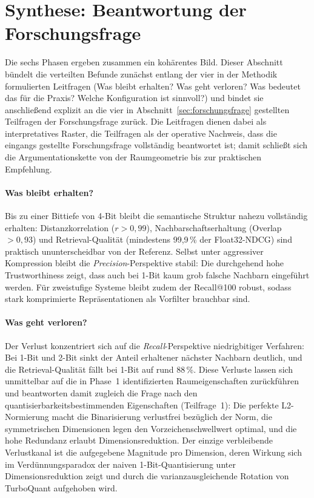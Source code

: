 \section{Synthese: Beantwortung der Forschungsfrage}
\label{sec:ergebnisse_synthese}
%
Die sechs Phasen ergeben zusammen ein kohärentes Bild.
Dieser Abschnitt bündelt die verteilten Befunde zunächst entlang der vier in der Methodik formulierten Leitfragen (Was bleibt erhalten? Was geht verloren? Was bedeutet das für die Praxis? Welche Konfiguration ist sinnvoll?) und bindet sie anschließend explizit an die vier in Abschnitt~\ref{sec:forschungsfrage} gestellten Teilfragen der Forschungsfrage zurück.
Die Leitfragen dienen dabei als interpretatives Raster, die Teilfragen als der operative Nachweis, dass die eingangs gestellte Forschungsfrage vollständig beantwortet ist; damit schließt sich die Argumentationskette von der Raumgeometrie bis zur praktischen Empfehlung.
%
\paragraph{Was bleibt erhalten?}
Bis zu einer Bittiefe von 4-Bit bleibt die semantische Struktur nahezu vollständig erhalten: Distanzkorrelation ($r > 0{,}99$), Nachbarschaftserhaltung (Overlap $> 0{,}93$) und Retrieval-Qualität (mindestens 99{,}9\,\% der Float32-NDCG) sind praktisch ununterscheidbar von der Referenz.
Selbst unter aggressiver Kompression bleibt die \emph{Precision}-Perspektive stabil: Die durchgehend hohe Trustworthiness zeigt, dass auch bei 1-Bit kaum grob falsche Nachbarn eingeführt werden.
Für zweistufige Systeme bleibt zudem der Recall@100 robust, sodass stark komprimierte Repräsentationen als Vorfilter brauchbar sind.
%
\paragraph{Was geht verloren?}
Der Verlust konzentriert sich auf die \emph{Recall}-Perspektive niedrigbitiger Verfahren: Bei 1-Bit und 2-Bit sinkt der Anteil erhaltener nächster Nachbarn deutlich, und die Retrieval-Qualität fällt bei 1-Bit auf rund 88\,\%.
Diese Verluste lassen sich unmittelbar auf die in Phase~1 identifizierten Raumeigenschaften zurückführen und beantworten damit zugleich die Frage nach den quantisierbarkeitsbestimmenden Eigenschaften (Teilfrage~1): Die perfekte L2-Normierung macht die Binarisierung verlustfrei bezüglich der Norm, die symmetrischen Dimensionen legen den Vorzeichenschwellwert optimal, und die hohe Redundanz erlaubt Dimensionsreduktion.
Der einzige verbleibende Verlustkanal ist die aufgegebene Magnitude pro Dimension, deren Wirkung sich im Verdünnungsparadox der naiven 1-Bit-Quantisierung unter Dimensionsreduktion zeigt und durch die varianzausgleichende Rotation von TurboQuant aufgehoben wird.
%
